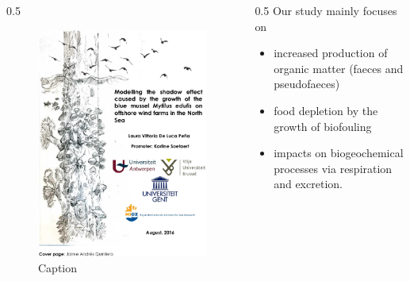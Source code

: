 \documentclass[final,xcolor=dvipsnames]{beamer}
\begin{document}
\begin{frame}
\begin{exampleblock}{}
\begin{columns}
\begin{column}{0.5\framewidth}
\begin{figure}
    \centering
    \includegraphics{./Figs/Context.png}
    \caption{Caption}
    \label{fig:my_label}
\end{figure}
\end{column}
\begin{column}{0.5\framewidth}
Our study mainly focuses on 
\begin{itemize}
    \item increased production of organic matter (faeces and pseudofaeces)
    \item food depletion by the growth of biofouling %
    \item impacts on biogeochemical processes via respiration and excretion. 
\end{itemize}
\end{column}
\end{columns}
\end{exampleblock}
\end{frame}
\end{document}
